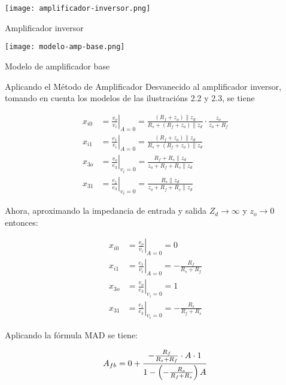 \begin{ilustracion}[ht]
    \centering
    \texttt{[image: amplificador-inversor.png]}
    \caption{Amplificador inversor}
    \label{ilus:mt-amplificador-inversor}
\end{ilustracion}

\begin{ilustracion}[ht]
    \centering
    \texttt{[image: modelo-amp-base.png]}
    \caption{Modelo de amplificador base}
    \label{ilus:mt-modelo-amp-base}
\end{ilustracion}


Aplicando el Método de Amplificador Desvanecido al amplificador inversor, tomando en cuenta los modelos de las ilustracións 2.2 y 2.3, se tiene

\begin{align*}
    x_{i0} &= \left. \frac{v_o}{v_i} \right|_{A=0} = \frac{(R_f + z_o) \parallel z_d}{R_s + (R_f + z_o) \parallel z_d} \cdot \frac{z_o}{z_o + R_f} \\
    x_{i1} &= \left. \frac{e_1}{v_i} \right|_{A=0} = \frac{(R_f + z_o) \parallel z_d}{R_s + (R_f + z_o) \parallel z_d} \\
    x_{3o} &= \left. \frac{v_o}{e_3} \right|_{v_i=0} = \frac{R_f + R_s \parallel z_d}{z_o + R_f + R_s \parallel z_d} \\
    x_{31} &= \left. \frac{e_1}{e_3} \right|_{v_i=0} = \frac{R_s \parallel z_d}{z_o + R_f + R_s \parallel z_d}
\end{align*}

Ahora, aproximando la impedancia de entrada y salida $Z_d \rightarrow \infty $ y $z_o \rightarrow 0$ entonces:

\begin{align*}
x_{i0} &= \left. \frac{v_o}{v_i} \right|_{A=0} = 0 \\
x_{i1} &= \left. \frac{e_1}{v_i} \right|_{A=0} = -\frac{R_f}{R_s + R_f} \\
x_{3o} &= \left. \frac{v_o}{e_3} \right|_{v_i=0} = 1 \\
x_{31} &= \left. \frac{e_1}{e_3} \right|_{v_i=0} = -\frac{R_s}{R_f + R_s}
\end{align*}

Aplicando la fórmula MAD se tiene: 

\begin{equation*}
A_{fb} = 0 + \frac{-\frac{R_f}{R_s + R_f} \cdot A \cdot 1}{1 - \left( -\frac{R_s}{R_f + R_s} \right) A} \\
\end{equation*}

